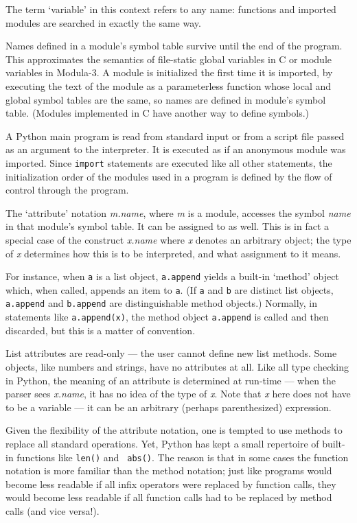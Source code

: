The term `variable' in this context refers to any name: functions and
imported modules are searched in exactly the same way.  

Names defined in a module's symbol table survive until the end of the
program.  This approximates the semantics of file-static global
variables in C or module variables in Modula-3.  A module is
initialized the first time it is imported, by executing the text of
the module as a parameterless function whose local and global symbol
tables are the same, so names are defined in module's symbol table.
(Modules implemented in C have another way to define symbols.)

A Python main program is read from standard input or from a script
file passed as an argument to the interpreter.  It is executed as if
an anonymous module was imported.  Since {\tt import} statements are
executed like all other statements, the initialization order of the
modules used in a program is defined by the flow of control through
the program.

The `attribute' notation {\em m.name}, where {\em m} is a module,
accesses the symbol {\em name} in that module's symbol table.  It can
be assigned to as well.  This is in fact a special case of the
construct {\em x.name} where {\em x} denotes an arbitrary object; the
type of {\em x} determines how this is to be interpreted, and what
assignment to it means.

For instance, when {\tt a} is a list object, {\tt a.append} yields a
built-in `method' object which, when called, appends an item to {\tt a}.
(If {\tt a} and {\tt b} are distinct list objects, {\tt a.append} and
{\tt b.append} are distinguishable method objects.)  Normally, in
statements like {\tt a.append(x)}, the method object {\tt a.append} is
called and then discarded, but this is a matter of convention.

List attributes are read-only --- the user cannot define new list
methods.  Some objects, like numbers and strings, have no attributes
at all.  Like all type checking in Python, the meaning of an attribute
is determined at run-time --- when the parser sees {\em x.name}, it
has no idea of the type of {\em x}.  Note that {\em x} here does not
have to be a variable --- it can be an arbitrary (perhaps
parenthesized) expression.

Given the flexibility of the attribute notation, one is tempted to use
methods to replace all standard operations.  Yet, Python has kept a
small repertoire of built-in functions like {\tt len()} and {\tt
abs()}.  The reason is that in some cases the function notation is
more familiar than the method notation; just like programs would
become less readable if all infix operators were replaced by function
calls, they would become less readable if all function calls had to be
replaced by method calls (and vice versa!).


